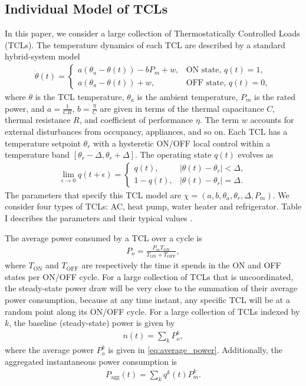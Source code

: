 \documentclass[onecolumn,journal]{IEEEtran}
\begin{document}
\subsection{Individual Model of \acp{TCL}}
\label{sec:model}
In this paper, we consider a large collection of Thermostatically Controlled Loads (TCLs). The temperature dynamics of each \ac{TCL} are described by a standard hybrid-system model
\begin{align}
\label{eq:hybrid_model}
 \dot{\theta}(t) =
  \begin{cases} 
	 a(\theta_a-\theta(t)) - b P_m + w, & \text{ON state, } q(t) = 1,\\	
	 a(\theta_a-\theta(t))  + w, & \text{OFF state, } q(t) = 0,
\end{cases}
\end{align}
where $\theta$ is the \ac{TCL} temperature, $\theta_a$ is the ambient temperature, $P_m$ is the rated power, and  $a = \frac{1}{C R}$, $b = \frac{\eta}{C}$ are given in terms of the thermal capacitance $C$, thermal resistance $R$, and coefficient of performance $\eta$. The term $w$ accounts for external disturbances from occupancy, appliances, and so on.  Each \ac{TCL} has a temperature setpoint $\theta_r$ with a hysteretic ON/OFF local control within a temperature band $[\theta_r - \Delta, \theta_r + \Delta]$.  The operating state $q(t)$ evolves as
\begin{align*}
\lim_{\epsilon \rightarrow 0} q(t+\epsilon) =
\begin{cases} 
	q(t), & |\theta(t) - \theta_r| < \Delta, \\
	1-q(t), & |\theta(t) - \theta_r| = \Delta.
\end{cases}
\end{align*}
The parameters that specify this \ac{TCL} model are $\chi = (a,b, \theta_a, \theta_r, \Delta, P_m)$. We consider four types of \acp{TCL}: AC, heat pump, water heater and refrigerator. Table I describes the parameters and their typical values \cite{mathieu_revenue}. 

The average power consumed by a \ac{TCL} over a cycle is 
\begin{align}\label{eq:average_power}
	P_o =  \frac{P_m T_{\textrm{ON}}}{T_{\textrm{ON}}+T_{\textrm{OFF}}},
\end{align}
where $T_{\textrm{ON}}$ and  $T_{\textrm{OFF}}$ are respectively the time it spends in the ON and OFF states per ON/OFF cycle. For a large collection of \acp{TCL} that is uncoordinated, the steady-state power draw will be very close to the summation of their average power consumption, because at any time instant, any specific \ac{TCL} will be at a random point along its ON/OFF cycle. For a large collection of  \acp{TCL} indexed by $k$, the baseline (steady-state) power is given by
\begin{align*}n(t)=\sum_{k}  P^k_o,
\end{align*}
where the average power $P^k_o$ is given in \eqref{eq:average_power}. 
Additionally, the aggregated instantaneous power consumption is 
\begin{align*}P_{\textrm{agg}}(t)=\sum_{k}  q^k(t) P^k_m.
\end{align*}
\end{document}

